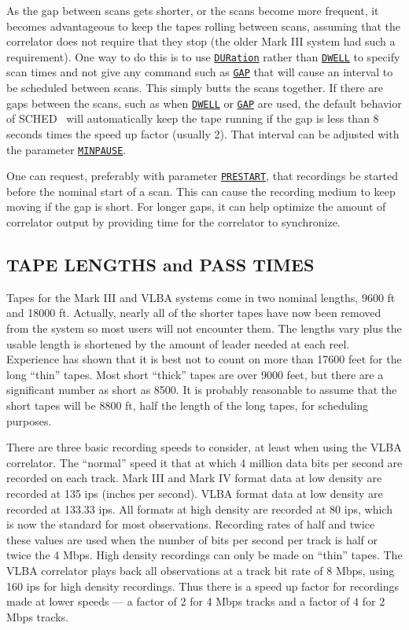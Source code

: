 \documentclass{report}
\newcommand{\schedb}{{\sc SCHED~}}
\begin{document}
As the gap between scans gets shorter, or the scans become more
frequent, it becomes advantageous to keep the tapes rolling between
scans, assuming that the correlator does not require that they stop
(the older Mark III system had such a requirement).  One way to do
this is to use 
{\hyperref[MP:DUR]{{\tt DURation}}} rather than 
{\hyperref[MP:DWELL]{{\tt DWELL}}}
to specify scan times and not give any command such as
{\hyperref[MP:GAP]{{\tt GAP}}} that will cause an interval to be scheduled
between scans.  This simply butts the scans together.  If there are gaps
between the scans, such as when 
{\hyperref[MP:DWELL]{{\tt DWELL}}} or
{\hyperref[MP:GAP]{{\tt GAP}}} are used, the default behavior of \schedb
will automatically keep the tape running if the gap is less than
8 seconds times the speed up factor (usually 2).  That interval can
be adjusted with the parameter 
{\hyperref[MP:MINPAUSE]{{\tt MINPAUSE}}}.

One can request, preferably with parameter 
{\hyperref[MP:PRESTART]{{\tt PRESTART}}},
that recordings be started before the nominal start of
a scan.  This can cause the recording medium to keep moving if the gap
is short.  For longer gaps, it can help optimize the amount of
correlator output by providing time for the correlator to synchronize.


\subsection{\label{SSSEC:TAPELEN}TAPE LENGTHS and PASS TIMES}

Tapes for the Mark III and VLBA systems come in two nominal lengths,
9600 ft and 18000 ft.  Actually, nearly all of the shorter tapes have
now been removed from the system so most users will not encounter
them.  The lengths vary plus the usable length is shortened by the
amount of leader needed at each reel.  Experience has shown that it is
best not to count on more than 17600 feet for the long ``thin'' tapes.
Most short ``thick'' tapes are over 9000 feet, but there are a
significant number as short as 8500.  It is probably reasonable to
assume that the short tapes will be 8800 ft, half the length of the
long tapes, for scheduling purposes.

There are three basic recording speeds to consider, at least when
using the VLBA correlator.  The ``normal'' speed it that at which 4
million data bits per second are recorded on each track.  Mark III and
Mark IV format data at low density are recorded at 135 ips (inches per
second).  VLBA format data at low density are recorded at 133.33 ips.
All formats at high density are recorded at 80 ips, which is now the
standard for most observations.  Recording rates of half and twice
these values are used when the number of bits per second per track is
half or twice the 4 Mbps.  High density recordings can only be made on
``thin'' tapes.  The VLBA correlator plays back all observations at a
track bit rate of 8 Mbps, using 160 ips for high density recordings.
Thus there is a speed up factor for recordings made at lower speeds
--- a factor of 2 for 4 Mbps tracks and a factor of 4 for 2 Mbps
tracks.
\end{document}
